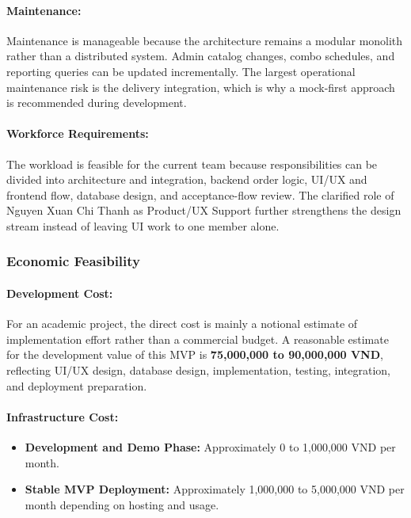 \paragraph{Maintenance:} Maintenance is manageable because the architecture remains a modular monolith rather than a distributed system. Admin catalog changes, combo schedules, and reporting queries can be updated incrementally. The largest operational maintenance risk is the delivery integration, which is why a mock-first approach is recommended during development.

\paragraph{Workforce Requirements:} The workload is feasible for the current team because responsibilities can be divided into architecture and integration, backend order logic, UI/UX and frontend flow, database design, and acceptance-flow review. The clarified role of Nguyen Xuan Chi Thanh as Product/UX Support further strengthens the design stream instead of leaving UI work to one member alone.

\subsubsection{Economic Feasibility}

\paragraph{Development Cost:} For an academic project, the direct cost is mainly a notional estimate of implementation effort rather than a commercial budget. A reasonable estimate for the development value of this MVP is \textbf{75,000,000 to 90,000,000 VND}, reflecting UI/UX design, database design, implementation, testing, integration, and deployment preparation.

\paragraph{Infrastructure Cost:}
\begin{itemize}
    \item \textbf{Development and Demo Phase:} Approximately 0 to 1,000,000 VND per month.
    \item \textbf{Stable MVP Deployment:} Approximately 1,000,000 to 5,000,000 VND per month depending on hosting and usage.
\end{itemize}


